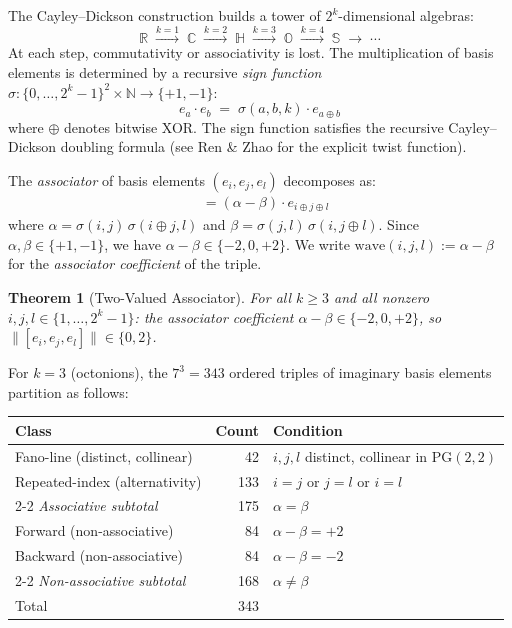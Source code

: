 \documentclass[11pt,a4paper]{article}
\newtheorem{theorem}{Theorem}[section]
\theoremstyle{definition}
\theoremstyle{remark}
\newcommand{\NN}{\mathbb{N}}
\newcommand{\RR}{\mathbb{R}}
\newcommand{\CC}{\mathbb{C}}
\newcommand{\HH}{\mathbb{H}}
\newcommand{\OO}{\mathbb{O}}
\newcommand{\SSS}{\mathbb{S}}
\newcommand{\PG}{\mathrm{PG}}
\newcommand{\wave}{\mathrm{wave}}
\begin{document}
The Cayley--Dickson construction \cite{dickson1919} builds a tower of
$2^k$-dimensional algebras:
\[
  \RR \;\xrightarrow{k=1}\; \CC \;\xrightarrow{k=2}\; \HH
  \;\xrightarrow{k=3}\; \OO \;\xrightarrow{k=4}\; \SSS
  \;\xrightarrow{}\; \cdots
\]
At each step, commutativity or associativity is lost. The multiplication
of basis elements is determined by a recursive \emph{sign function}
$\sigma: \{0,\ldots,2^k-1\}^2 \times \NN \to \{+1,-1\}$:
\[
  e_a \cdot e_b \;=\; \sigma(a,b,k) \cdot e_{a \oplus b}
\]
where $\oplus$ denotes bitwise XOR. The sign function satisfies the
recursive Cayley--Dickson doubling formula (see Ren \& Zhao
\cite{renzhao2023} for the explicit twist function).

The \emph{associator} of basis elements $(e_i, e_j, e_l)$ decomposes as:
\begin{align}
  [e_i, e_j, e_l] &= (\alpha - \beta) \cdot e_{i \oplus j \oplus l}
  \label{eq:assoc-decomp}
\end{align}
where $\alpha = \sigma(i,j)\,\sigma(i \oplus j, l)$ and
$\beta = \sigma(j,l)\,\sigma(i, j \oplus l)$. Since
$\alpha, \beta \in \{+1,-1\}$, we have $\alpha - \beta \in \{-2, 0, +2\}$.
We write $\wave(i,j,l) := \alpha - \beta$ for the \emph{associator
coefficient} of the triple.

\begin{theorem}[Two-Valued Associator]\label{thm:binary-norm}
For all $k \geq 3$ and all nonzero $i, j, l \in \{1,\ldots,2^k-1\}$:
the associator coefficient $\alpha - \beta \in \{-2, 0, +2\}$,
so $\lVert[e_i, e_j, e_l]\rVert \in \{0, 2\}$.
\end{theorem}

For $k=3$ (octonions), the $7^3 = 343$ ordered triples of imaginary
basis elements partition as follows:

\begin{center}
\begin{tabular}{lrl}
\toprule
Class & Count & Condition \\
\midrule
Fano-line (distinct, collinear) & 42 & $i,j,l$ distinct, collinear in $\PG(2,2)$ \\
Repeated-index (alternativity) & 133 & $i{=}j$ or $j{=}l$ or $i{=}l$ \\
\cmidrule{2-2}
\emph{Associative subtotal} & 175 & $\alpha = \beta$ \\
\midrule
Forward (non-associative) & 84 & $\alpha - \beta = +2$ \\
Backward (non-associative) & 84 & $\alpha - \beta = -2$ \\
\cmidrule{2-2}
\emph{Non-associative subtotal} & 168 & $\alpha \neq \beta$ \\
\midrule
Total & 343 & \\
\bottomrule
\end{tabular}
\end{center}
\end{document}
